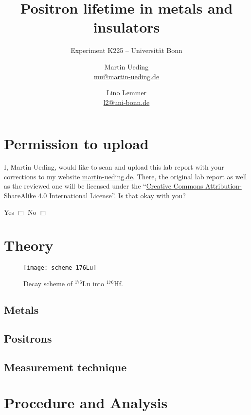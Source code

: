 \documentclass[11pt, english, fleqn, DIV=15, headinclude, BCOR=2cm]{scrreprt}
\title{Positron lifetime in metals and insulators}
\subtitle{Experiment K225 -- Universität Bonn}
\author{%
    Martin Ueding \\
    \small{\href{mailto:mu@martin-ueding.de}{mu@martin-ueding.de}}
    \and
    Lino Lemmer \\
    \small{\href{mailto:l2@uni-bonn.de}{l2@uni-bonn.de}}
}
\date{\daterange{2016-03-24}{2016-03-25}}
\begin{document}
\maketitle

\begin{abstract}
\end{abstract}

\tableofcontents

\chapter*{Permission to upload}

I, Martin Ueding, would like to scan and upload this lab report with your
corrections to my website \href{http://martin-ueding.de}{martin-ueding.de}.
There, the original lab report as well as the reviewed one will be licensed
under the “\href{http://creativecommons.org/licenses/by-sa/4.0/}{Creative
Commons Attribution-ShareAlike 4.0 International License}”. Is that okay with
you?

Yes $\Box$ \hspace{2cm} No $\Box$

\chapter{Theory}

\begin{figure}
    \centering
    \texttt{[image: scheme-176Lu]}
    \caption{%
        Decay scheme of $^{176}\mathrm{Lu}$ into $^{176}\mathrm{Hf}$.
    }
    \label{fig:scheme-176Lu}
\end{figure}

\section{Metals}

\section{Positrons}

\section{Measurement technique}

\chapter{Procedure and Analysis}
\end{document}
